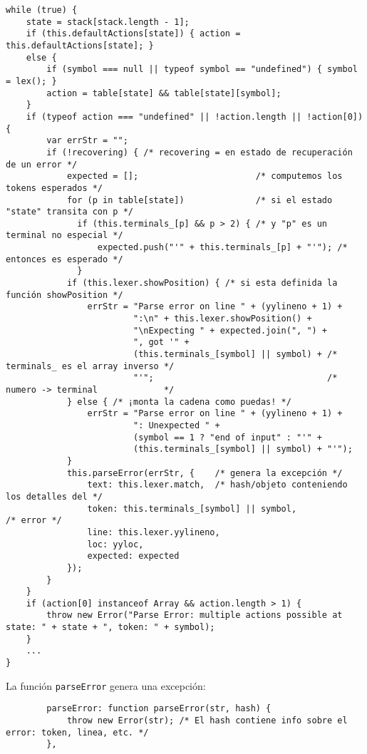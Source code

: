 \begin{verbatim}
while (true) {
    state = stack[stack.length - 1];
    if (this.defaultActions[state]) { action = this.defaultActions[state]; } 
    else {
        if (symbol === null || typeof symbol == "undefined") { symbol = lex(); }
        action = table[state] && table[state][symbol];
    }
    if (typeof action === "undefined" || !action.length || !action[0]) {
        var errStr = "";
        if (!recovering) { /* recovering = en estado de recuperación de un error */
            expected = [];                       /* computemos los tokens esperados */
            for (p in table[state])              /* si el estado "state" transita con p */
              if (this.terminals_[p] && p > 2) { /* y "p" es un terminal no especial */
                  expected.push("'" + this.terminals_[p] + "'"); /* entonces es esperado */
              }
            if (this.lexer.showPosition) { /* si esta definida la función showPosition */
                errStr = "Parse error on line " + (yylineno + 1) + 
                         ":\n" + this.lexer.showPosition() + 
                         "\nExpecting " + expected.join(", ") + 
                         ", got '" + 
                         (this.terminals_[symbol] || symbol) + /* terminals_ es el array inverso */
                         "'";                                  /* numero -> terminal             */
            } else { /* ¡monta la cadena como puedas! */
                errStr = "Parse error on line " + (yylineno + 1) + 
                         ": Unexpected " + 
                         (symbol == 1 ? "end of input" : "'" + 
                         (this.terminals_[symbol] || symbol) + "'");
            }
            this.parseError(errStr, {    /* genera la excepción */
                text: this.lexer.match,  /* hash/objeto conteniendo los detalles del */
                token: this.terminals_[symbol] || symbol,                   /* error */
                line: this.lexer.yylineno,
                loc: yyloc,
                expected: expected
            });
        }
    }
    if (action[0] instanceof Array && action.length > 1) {
        throw new Error("Parse Error: multiple actions possible at state: " + state + ", token: " + symbol);
    }
    ...
}
\end{verbatim}

La función \verb|parseError| genera una excepción:

\begin{verbatim}
        parseError: function parseError(str, hash) {
            throw new Error(str); /* El hash contiene info sobre el error: token, linea, etc. */
        },
\end{verbatim}

